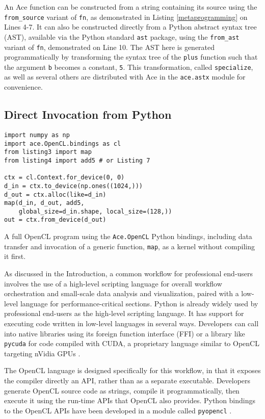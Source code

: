 \documentclass[10pt, conference, compsocconf]{IEEEtran}
\begin{document}
An Ace function can be constructed from a string containing its source using the \verb|from_source| variant of \verb|fn|, as demonstrated in Listing \ref{metaprogramming} on Lines 4-7. It can also be constructed directly from a Python abstract syntax tree (AST), available via the Python standard \verb|ast| package, using the \verb|from_ast| variant of \verb|fn|, demonstrated on Line 10. The AST here is generated programmatically by transforming the syntax tree of the \verb|plus| function such that the argument \verb|b| becomes a constant, \verb|5|. This transformation, called \verb|specialize|, as well as several others are distributed with Ace in the \verb|ace.astx| module for convenience.
\subsection{Direct Invocation from Python}\label{direct}

\begin{codelisting}
\begin{lstlisting}
import numpy as np
import ace.OpenCL.bindings as cl
from listing3 import map
from listing4 import add5 # or Listing 7

ctx = cl.Context.for_device(0, 0)
d_in = ctx.to_device(np.ones((1024,)))
d_out = ctx.alloc(like=d_in)
map(d_in, d_out, add5, 
    global_size=d_in.shape, local_size=(128,))
out = ctx.from_device(d_out)
\end{lstlisting}
\caption{A full OpenCL program using the \texttt{Ace.OpenCL} Python bindings, including data transfer and  invocation of a generic function, \texttt{map}, as a kernel without compiling it first.}
\label{py}
\end{codelisting}

As discussed in the Introduction, a common workflow for professional end-users involves the use of a high-level scripting language for overall workflow orchestration and small-scale data analysis and visualization, paired with a low-level language for performance-critical sections. Python is already widely used by professional end-users as the high-level scripting language. It has support for executing code written in low-level languages in several ways. Developers can call into native libraries using its foreign function interface (FFI) or a library like \verb|pycuda| for code compiled with CUDA, a proprietary language similar to OpenCL targeting nVidia GPUs \cite{pycuda}. 

The OpenCL language is designed specifically for this workflow, in that it exposes the compiler directly an API, rather than as a separate executable. Developers generate OpenCL source code as strings, compile it programmatically, then execute it using the run-time APIs that OpenCL also provides. Python bindings to the OpenCL APIs have been developed in a module called \verb|pyopencl| \cite{pyopencl}.
\end{document}
